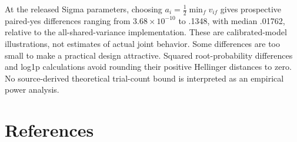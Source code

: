 \documentclass[
  11pt,
]{article}
\let\ctdoldsection\section
\renewcommand{\section}{\Needspace{8\baselineskip}\ctdoldsection}
\begin{document}
At the released Sigma parameters, choosing \(a_i=\tfrac12\min_f v_{if}\)
gives prospective paired-yes differences ranging from
\(3.68\times10^{-10}\) to .1348, with median .01762, relative to the
all-shared-variance implementation. These are calibrated-model
illustrations, not estimates of actual joint behavior. Some differences
are too small to make a practical design attractive. Squared
root-probability differences and log1p calculations avoid rounding their
positive Hellinger distances to zero. No source-derived theoretical
trial-count bound is interpreted as an empirical power analysis.

\hypertarget{references}{%
\section{References}\label{references}}
\end{document}

